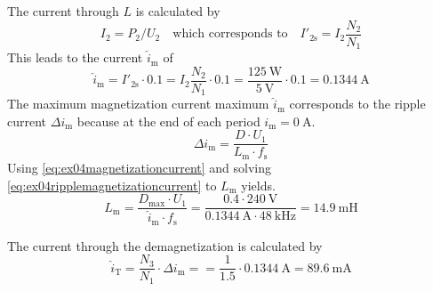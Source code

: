 \begin{solutionblock}
    The current through $L$ is calculated by
    \begin{equation}
        I_\mathrm{2}=P_\mathrm{2}/U_\mathrm{2} \quad \text{which corresponds to} \quad 
        I'_\mathrm{2s}=I_\mathrm{2}\frac{N_\mathrm{2}}{N_\mathrm{1}}
    \end{equation}
    This leads to the current $\hat{i}_\mathrm{m}$ of
    \begin{equation}
        \hat{i}_\mathrm{m}=I'_\mathrm{2s}\cdot 0.1=I_\mathrm{2}\frac{N_\mathrm{2}}{N_\mathrm{1}}\cdot 0.1
        =\frac{\SI{125}{\watt}}{\SI{5}{\volt}} \cdot 0.1 =\SI{0.1344}{\ampere}
        \label{eq:ex04magnetizationcurrent}  
    \end{equation}
    The maximum magnetization current maximum $\hat{i}_\mathrm{m}$ corresponds to the ripple current $\Delta{i}_\mathrm{m}$
    because at the end of each period $i_\mathrm{m}=\SI{0}{\ampere}$.
    \begin{equation}
        \Delta i_\mathrm{m}= \frac{D \cdot U_\mathrm{1}}{L_\mathrm{m} \cdot f_\mathrm{s}}
        \label{eq:ex04ripplemagnetizationcurrent}          
    \end{equation}
    Using \eqref{eq:ex04magnetizationcurrent} and solving \eqref{eq:ex04ripplemagnetizationcurrent} to $L_\mathrm{m}$ yields.
    \begin{equation}
        L_\mathrm{m}= \frac{D_\mathrm{max} \cdot U_\mathrm{1}}{\hat{i}_\mathrm{m} \cdot f_\mathrm{s}}
                    = \frac{0.4 \cdot \SI{240}{\volt}}{\SI{0.1344}{\ampere} \cdot \SI{48}{\kilo\hertz}}=\SI{14.9}{\milli\henry}
    \end{equation}
\end{solutionblock}

\begin{solutionblock}
    The current through the demagnetization is calculated by
    \begin{equation}
        \hat{i}_\mathrm{T}=\frac{N_\mathrm{3}}{N_\mathrm{1}} \cdot \Delta i_\mathrm{m}=
        =\frac{1}{1.5} \cdot \SI{0.1344}{\ampere}=\SI{89.6}{\milli\ampere}
    \end{equation}
    
      

\end{solutionblock}
        
